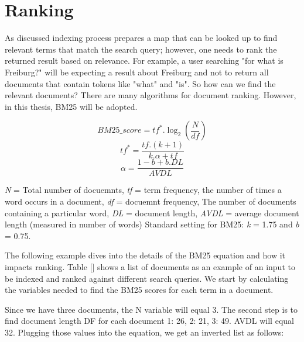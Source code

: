 \section{Ranking}
\label{sec:ranking}
As discussed indexing process prepares a map that can be looked up to find relevant terms that match the search query; however, one needs to rank the returned result based on relevance. For example, a user searching "for what is Freiburg?" will be expecting a result about Freiburg and not to return all documents that contain tokens like "what" and "is". So how can we find the relevant documents? There are many algorithms for document ranking. However, in this thesis, BM25 will be adopted. 

\begin{equation}
BM25\_score = tf^*.\log_2(\frac{N}{df})
\label{eq:depth}
\end{equation}
\begin{equation}
tf^* = \frac{tf.(k+1)}{k.\alpha+tf}
\label{eq:depth}
\end{equation}
\begin{equation}
\alpha = \frac{1-b+b.DL}{AVDL}
\label{eq:depth}
\end{equation}

\textit{N} = Total number of docuemnts, \textit{tf} = term frequency, the number of times a word occurs in a document, \textit{df} = docuemnt frequency, The number of documents containing a particular word, \textit{DL} = document length, \textit{AVDL} =
average document length (measured in number of words)
Standard setting for BM25: \textit{k} = 1.75 and \textit{b} = 0.75.

The following example dives into the details of the BM25 equation and how it impacts ranking.  Table [] shows a list of documents as an example of an input to be indexed and ranked against different search queries. We start by calculating the variables needed to find the BM25 scores for each term in a document.    

Since we have three documents, the N variable will equal 3. The second step is to find document length DF for each document {1: 26, 2: 21, 3: 49}. AVDL will equal 32. Plugging those values into the equation, we get an inverted list as follows: 

